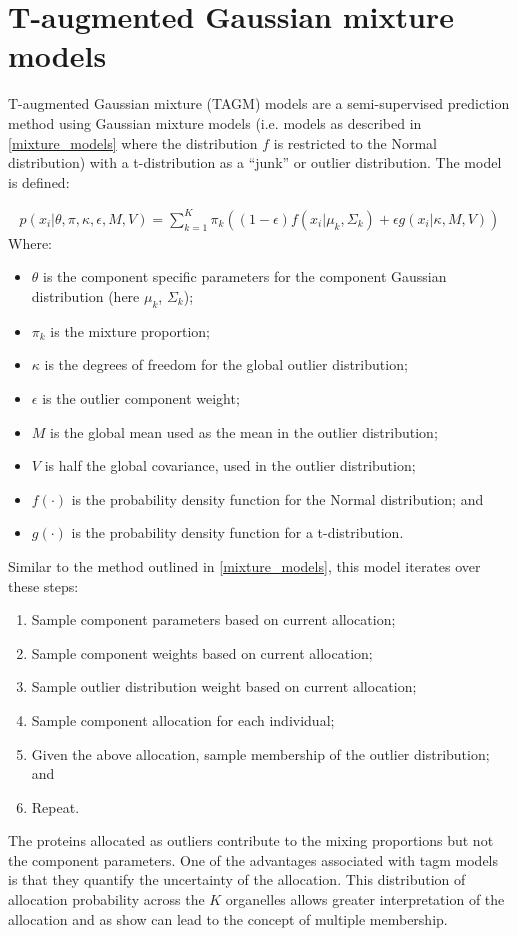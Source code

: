 \documentclass[11pt]{article} %
\begin{document}
\section{T-augmented Gaussian mixture models}
T-augmented Gaussian mixture (TAGM) models are a semi-supervised prediction method using Gaussian mixture models (i.e. models as described in \ref{mixture_models} where the distribution $f$ is restricted to the Normal distribution) with a t-distribution as a ``junk'' or outlier distribution. The model is defined:

\begin{align} \label{tagm_model}
p(x_i | \theta, \pi, \kappa, \epsilon, M, V) = \sum_{k=1}^K\pi_k((1 - \epsilon) f(x_i|\mu_k,\Sigma_k) + \epsilon g(x_i |\kappa, M, V))
\end{align}
Where:
\begin{itemize}
 \item $\theta$ is the component specific parameters for the component Gaussian distribution (here $\mu_k$, $\Sigma_k$);
 \item $\pi_k$ is the mixture proportion;
 \item $\kappa$ is the degrees of freedom for the global outlier distribution;
 \item $\epsilon$ is the outlier component weight;
 \item $M$ is the global mean used as the mean in the outlier distribution;
 \item $V$ is half the global covariance, used in the outlier distribution;
 \item $f(\cdot)$ is the probability density function for the Normal distribution; and 
 \item $g(\cdot)$ is the probability density function for a t-distribution.
\end{itemize}
Similar to the method outlined in \ref{mixture_models}, this model iterates over these steps:
\begin{enumerate}
 \item Sample component parameters based on current allocation;
 \item Sample component weights based on current allocation;
 \item Sample outlier distribution weight based on current allocation;
 \item Sample component allocation for each individual;
 \item Given the above allocation, sample membership of the outlier distribution; and
 \item Repeat.
\end{enumerate}
The proteins allocated as outliers contribute to the mixing proportions but not the component parameters. One of the advantages associated with tagm models is that they quantify the uncertainty of the allocation. This distribution of allocation probability across the $K$ organelles allows greater interpretation of the allocation and as \citet{CrookBayesianMixtureModelling2018a} show can lead to the concept of multiple membership.
\end{document}
